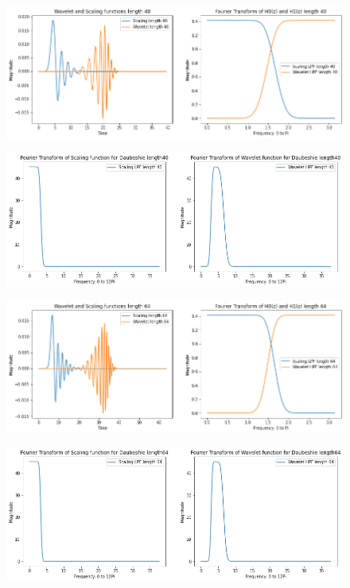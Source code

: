 \documentclass{article}
\begin{document}
\begin{figure}[H]
\begin{center}
\includegraphics[scale = 0.5]{40.png}
\end{center}
\end{figure}

\begin{figure}[H]
\begin{center}
\includegraphics[scale = 0.5]{40f.png}
\end{center}
\end{figure}

\begin{figure}[H]
\begin{center}
\includegraphics[scale = 0.5]{64.png}
\end{center}
\end{figure}

\begin{figure}[H]
\begin{center}
\includegraphics[scale = 0.5]{64f.png}
\end{center}
\end{figure}
\end{document}
